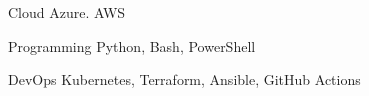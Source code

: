 


\begin{cvskills}


\cvskill
{Cloud} %
{Azure. AWS} %


\cvskill
{Programming} %
{Python, Bash, PowerShell} %


\cvskill
{DevOps} %
{Kubernetes, Terraform, Ansible, GitHub Actions} %


\end{cvskills}
